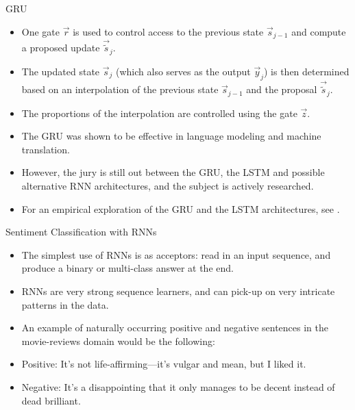 \documentclass[handout]{beamer}
\begin{document}
\begin{frame}{GRU}
\begin{scriptsize}
\begin{itemize}
\item One gate $\vec{r}$ is used to control access to the previous state $\vec{s}_{j-1}$ and compute a proposed update $\vec{\widetilde{s}}_j$.
\item The updated state $\vec{s}_j$ (which also serves as the output $\vec{y}_j$) is then determined based on an interpolation of the previous state $\vec{s}_{j-1}$ and the proposal $\vec{\widetilde{s}}_j$.
\item The proportions of the interpolation are controlled using the gate $\vec{z}$.
\item The GRU was shown to be effective in language modeling and machine translation.
\item However, the jury is still out between the GRU, the LSTM and possible alternative RNN architectures, and the subject is actively researched. 
\item For an empirical exploration of the GRU and the LSTM architectures, see \cite{jozefowicz2015empirical}.
\end{itemize}
\end{scriptsize}
\end{frame}



\begin{frame}{Sentiment Classification with RNNs}
\begin{scriptsize}
\begin{itemize}
\item The simplest use of RNNs is as acceptors: read in an input sequence, and produce a binary or multi-class answer at the end.
\item RNNs are very strong sequence learners, and can pick-up on very
intricate patterns in the data.
\item An example of naturally occurring positive and negative sentences in the movie-reviews domain would be the following:
\item Positive: It's not life-affirming—it’s vulgar and mean, but I liked it.
\item Negative: It's a disappointing that it only manages to be decent instead of dead brilliant.
\end{itemize}
\end{scriptsize}
\end{frame}
\end{document}
